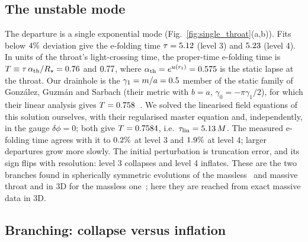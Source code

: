 \documentclass[twocolumn,floatfix,aps,prd,superscriptaddress,nofootinbib]{revtex4-2}
\begin{document}
\subsection{The unstable mode}
\label{sec:single:instability}

The departure is a single exponential mode (Fig.~\ref{fig:single_throat}(a,b)). Fits below $4\%$ deviation give the e-folding time $\tau=5.12$ (level 3) and $5.23$ (level 4). In units of the throat's light-crossing time, the proper-time e-folding time is $T\equiv\tau\,\alpha_{\rm th}/R_\star=0.76$ and $0.77$, where $\alpha_{\rm th}=e^{u(r_t)}=0.575$ is the static lapse at the throat. Our drainhole is the $\gamma_1=m/a=0.5$ member of the static family of Gonz\'alez, Guzm\'an and Sarbach (their metric with $b=a$, $\gamma_0=-\pi\gamma_1/2$), for which their linear analysis gives $T=0.758$~\cite{gonzalez2009lin}. We solved the linearised field equations of this solution ourselves, with their regularised master equation and, independently, in the gauge $\delta\phi=0$; both give $T=0.7584$, i.e.\ $\tau_{\rm lin}=5.13\,M$. The measured e-folding time agrees with it to $0.2\%$ at level 3 and $1.9\%$ at level 4; larger departures grow more slowly. The initial perturbation is truncation error, and its sign flips with resolution: level 3 collapses and level 4 inflates. These are the two branches found in spherically symmetric evolutions of the massless~\cite{shinkai2002,calhoun2022} and massive~\cite{gonzalez2009,xu2025} throat and in 3D for the massless one~\cite{shirokov2026}; here they are reached from exact massive data in 3D.

\subsection{Branching: collapse versus inflation}
\label{sec:single:branching}
\end{document}
